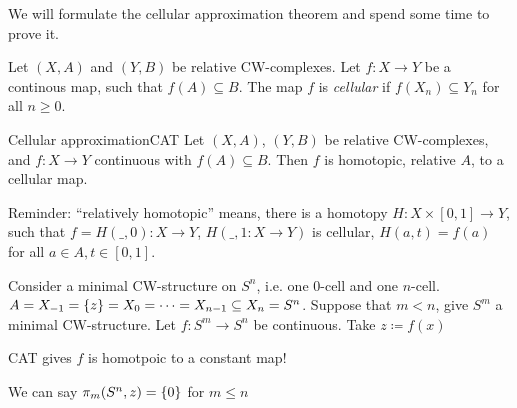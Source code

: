 \documentclass{TemplateLecture}
\begin{document}
We will formulate the cellular approximation theorem and spend some time to prove it.

\begin{defi}{}{}
    Let \((X,A)\) and \((Y,B)\) be relative CW-complexes. Let \(f \colon X\to Y\) be a continous map, such that \(f(A) \subseteq B\). The map \(f\) is \emph{cellular} if  \(f(X_n) \subseteq Y_n\) for all \(n \geq 0\).
\end{defi}

\begin{thm}{Cellular approximation}{CAT}
    Let \((X,A)\), \((Y,B)\) be relative CW-complexes, and \(f\colon X \to Y\) continuous with \(f(A) \subseteq B\). Then \(f\) is homotopic, relative \(A\), to a cellular map.
\end{thm}

Reminder: \enquote{relatively homotopic} means, there is a homotopy \(H\colon X\times [0,1] \to Y\), such that \(f = H(\_, 0) \colon X \to Y\), \(H(\_, 1\colon X \to Y)\) is cellular, \(H(a,t) = f(a)\) for all \(a \in A, t \in [0,1]\).

\begin{example}
    Consider a minimal CW-structure on \(S^n\), i.e. one \(0\)-cell and one \(n\)-cell.
    \(A = X_{-1} = \{z\} = X_0 = \dots = X_{n-1} \subseteq X_n = S^n\).
    Suppose that \(m < n\), give \(S^m\) a minimal CW-structure. Let \(f\colon S^m \to S^n\) be continuous. Take \(z \coloneq f(x)\)

    CAT gives \(f\) is homotpoic to a constant map! %

    We can say \(\pi_m(S^n, z) = \{0\}\) for \(m \leq n\)
\end{example}
\end{document}
